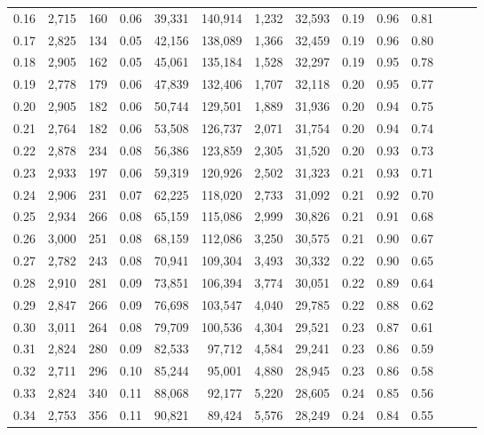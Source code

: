 \begin{tabular}{rrrrrrrrrrrrrr}
0.16 &  2,715 &    160 &  0.06 &   39,331 &  140,914 &   1,232 &  32,593 &  0.19 &  0.96 &      0.81 \\
0.17 &  2,825 &    134 &  0.05 &   42,156 &  138,089 &   1,366 &  32,459 &  0.19 &  0.96 &      0.80 \\
0.18 &  2,905 &    162 &  0.05 &   45,061 &  135,184 &   1,528 &  32,297 &  0.19 &  0.95 &      0.78 \\
0.19 &  2,778 &    179 &  0.06 &   47,839 &  132,406 &   1,707 &  32,118 &  0.20 &  0.95 &      0.77 \\
0.20 &  2,905 &    182 &  0.06 &   50,744 &  129,501 &   1,889 &  31,936 &  0.20 &  0.94 &      0.75 \\
0.21 &  2,764 &    182 &  0.06 &   53,508 &  126,737 &   2,071 &  31,754 &  0.20 &  0.94 &      0.74 \\
0.22 &  2,878 &    234 &  0.08 &   56,386 &  123,859 &   2,305 &  31,520 &  0.20 &  0.93 &      0.73 \\
0.23 &  2,933 &    197 &  0.06 &   59,319 &  120,926 &   2,502 &  31,323 &  0.21 &  0.93 &      0.71 \\
0.24 &  2,906 &    231 &  0.07 &   62,225 &  118,020 &   2,733 &  31,092 &  0.21 &  0.92 &      0.70 \\
0.25 &  2,934 &    266 &  0.08 &   65,159 &  115,086 &   2,999 &  30,826 &  0.21 &  0.91 &      0.68 \\
0.26 &  3,000 &    251 &  0.08 &   68,159 &  112,086 &   3,250 &  30,575 &  0.21 &  0.90 &      0.67 \\
0.27 &  2,782 &    243 &  0.08 &   70,941 &  109,304 &   3,493 &  30,332 &  0.22 &  0.90 &      0.65 \\
0.28 &  2,910 &    281 &  0.09 &   73,851 &  106,394 &   3,774 &  30,051 &  0.22 &  0.89 &      0.64 \\
0.29 &  2,847 &    266 &  0.09 &   76,698 &  103,547 &   4,040 &  29,785 &  0.22 &  0.88 &      0.62 \\
0.30 &  3,011 &    264 &  0.08 &   79,709 &  100,536 &   4,304 &  29,521 &  0.23 &  0.87 &      0.61 \\
0.31 &  2,824 &    280 &  0.09 &   82,533 &   97,712 &   4,584 &  29,241 &  0.23 &  0.86 &      0.59 \\
0.32 &  2,711 &    296 &  0.10 &   85,244 &   95,001 &   4,880 &  28,945 &  0.23 &  0.86 &      0.58 \\
0.33 &  2,824 &    340 &  0.11 &   88,068 &   92,177 &   5,220 &  28,605 &  0.24 &  0.85 &      0.56 \\
0.34 &  2,753 &    356 &  0.11 &   90,821 &   89,424 &   5,576 &  28,249 &  0.24 &  0.84 &      0.55 \\

\end{tabular}
